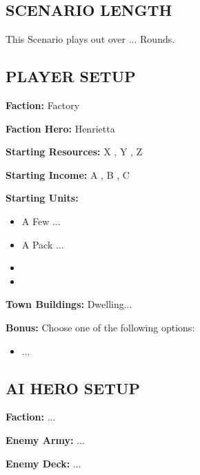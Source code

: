 \cleardoublepage{}

\begin{multicols*}{2}

\subsection*{\MakeUppercase{Scenario Length}}

This Scenario plays out over ... Rounds.

\subsection*{\MakeUppercase{Player Setup}}

\textbf{Faction:} Factory

\textbf{Faction Hero:} Henrietta

\textbf{Starting Resources:} X , Y , Z 

\textbf{Starting Income:} A , B , C 

\textbf{Starting Units:}
\begin{itemize}
  \item A Few ...
  \item A Pack ...
  \item {}
  \item {}
\end{itemize}

\textbf{Town Buildings:}  Dwelling...

\textbf{Bonus:} Choose one of the following options:
\begin{itemize}
    \item ...
\end{itemize}

\subsection*{\MakeUppercase{AI Hero Setup}}

\textbf{Faction:} ...

\textbf{Enemy Army:} ...

\textbf{Enemy Deck:} ...


\end{multicols*}
